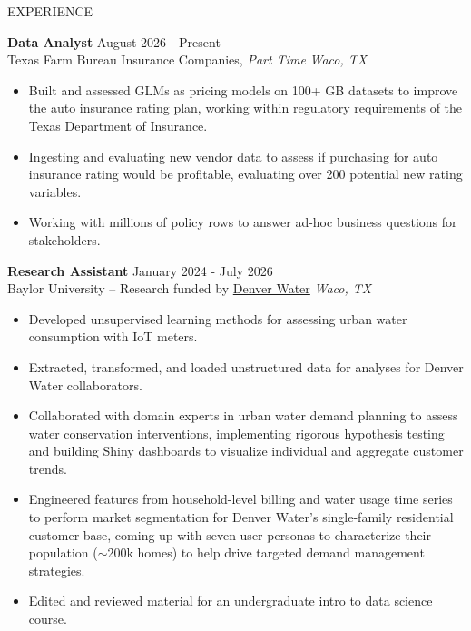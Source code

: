 \documentclass{resume} %
\begin{document}


\begin{rSection}{EXPERIENCE}

\textbf{Data Analyst} \hfill August 2026 - Present\\
Texas Farm Bureau Insurance Companies, \textit{Part Time} \hfill \textit{Waco, TX}
 \begin{itemize}
    \itemsep -3pt {}
     \item Built and assessed GLMs as pricing models on 100+ GB datasets to improve the auto insurance rating plan, working within regulatory requirements of the Texas Department of Insurance.
     \item Ingesting and evaluating new vendor data to assess if purchasing for auto insurance rating would be profitable, evaluating over 200 potential new rating variables.
     \item Working with millions of policy rows to answer ad-hoc business questions for stakeholders.
 \end{itemize}

\textbf{Research Assistant} \hfill January 2024 - July 2026\\
Baylor University -- Research funded by \href{https://www.denverwater.org}{Denver Water} \hfill \textit{Waco, TX}
 \begin{itemize}
    \itemsep -3pt {}
     \item Developed unsupervised learning methods for assessing urban water consumption with IoT meters.
     \item Extracted, transformed, and loaded unstructured data for analyses for Denver Water collaborators.
     \item Collaborated with domain experts in urban water demand planning to assess water conservation interventions, implementing rigorous hypothesis testing and building Shiny dashboards to visualize individual and aggregate customer trends.
     \item Engineered features from household-level billing and water usage time series to perform market segmentation for Denver Water's single-family residential customer base, coming up with seven user personas to characterize their population ($\sim$200k homes) to help drive targeted demand management strategies.
     \item Edited and reviewed material for an undergraduate intro to data science course.
 \end{itemize}


\end{rSection}
\end{document}
